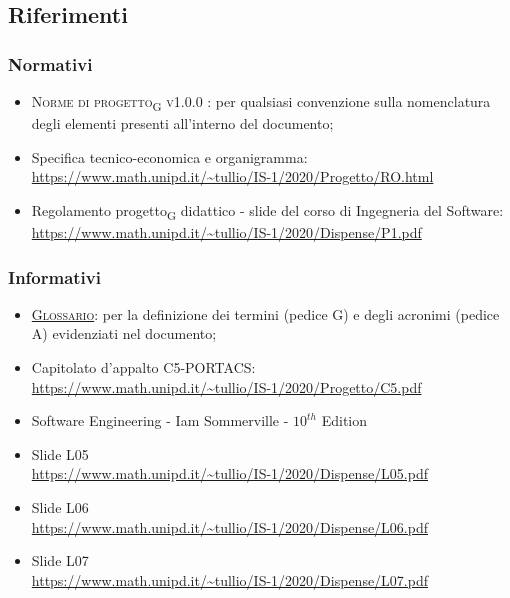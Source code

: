 \subsection{Riferimenti}



\subsubsection{Normativi}

\begin{itemize}
	\item \textsc{Norme di progetto\textsubscript{G} v1.0.0 }: per qualsiasi convenzione sulla nomenclatura degli elementi presenti all’interno del documento;
	\item Specifica tecnico-economica e organigramma: \\ {\url{https://www.math.unipd.it/~tullio/IS-1/2020/Progetto/RO.html}} %
	\item Regolamento progetto\textsubscript{G} didattico - slide del corso di Ingegneria del Software: \\ {\url{https://www.math.unipd.it/~tullio/IS-1/2020/Dispense/P1.pdf}}
\end{itemize}



\subsubsection{Informativi}
\begin{itemize}
	\item \textsc{\href{https://github.com/Three-Way-Milkshake/docs/wiki/Glossario}{Glossario}}: per la definizione dei termini (pedice G) e degli acronimi (pedice A) evidenziati nel documento;
	\item Capitolato d'appalto C5-PORTACS: \\
{\url{https://www.math.unipd.it/~tullio/IS-1/2020/Progetto/C5.pdf}}
	\item Software Engineering - Iam Sommerville - $10^{th}$ Edition
	\item Slide L05 \\
	{\url{https://www.math.unipd.it/~tullio/IS-1/2020/Dispense/L05.pdf}}%
	\item Slide L06 \\
	{\url{https://www.math.unipd.it/~tullio/IS-1/2020/Dispense/L06.pdf}}%
	\item Slide L07 \\
	{\url{https://www.math.unipd.it/~tullio/IS-1/2020/Dispense/L07.pdf}}%
\end{itemize}
